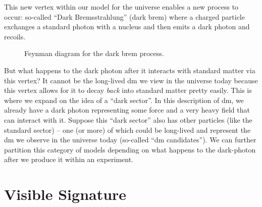 This new vertex within our model for the universe enables a new process to occur: so-called
``Dark Bremsstrahlung'' (dark brem) where a charged particle exchanges a standard photon with
a nucleus and then emits a dark photon and recoils.

\begin{figure}
    \centering
    \caption{
        Feynman diagram for the dark brem process.
    }
    \label{fig:dark-brem-feynman}
\end{figure}

But what happens to the dark photon after it interacts with standard matter via this vertex?
It cannot be the long-lived \gls{dm} we view in the universe today because this vertex allows for
it to decay \emph{back} into standard matter pretty easily. This is where we expand on the idea of
a ``dark sector''. In this description of \gls{dm}, we already have a dark photon representing some
force and a very heavy field that can interact with it. Suppose this ``dark sector'' also has other
particles (like the standard sector) -- one (or more) of which could be long-lived and represent
the \gls{dm} we observe in the universe today (so-called ``\gls{dm} candidates''). We can further
partition this category of models depending on what happens to the \gls{dark-photon} after we produce
it within an experiment.

\section{Visible Signature}


